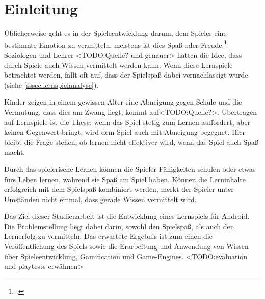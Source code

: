 \section{Einleitung}
	Üblicherweise geht es in der Spieleentwicklung darum, dem Spieler eine bestimmte Emotion zu vermitteln, meistens ist dies Spaß oder Freude.\footcite[Abstract]{persona} Soziologen und Lehrer <TODO:Quelle? und genauer> hatten die Idee, dass durch Spiele auch Wissen vermittelt werden kann. Wenn diese Lernspiele betrachtet werden, fällt oft auf, dass der Spielspaß dabei vernachlässigt wurde (siehe \ref{sssec:lernspielanalyse}).

	Kinder zeigen in einem gewissen Alter eine Abneigung gegen Schule und die Vermutung, dass dies am Zwang liegt, kommt auf<TODO:Quelle?>. Übertragen auf Lernspiele ist die These: wenn das Spiel stetig zum Lernen auffordert, aber keinen Gegenwert bringt, wird dem Spiel auch mit Abneigung begegnet.
	Hier bleibt die Frage stehen, ob lernen nicht effektiver wird, wenn das Spiel auch Spaß macht.

	Durch das spielerische Lernen können die Spieler Fähigkeiten schulen oder etwas fürs Leben lernen, während sie Spaß am Spiel haben. Können die Lerninhalte erfolgreich mit dem Spielspaß kombiniert werden, merkt der Spieler unter Umständen nicht einmal, dass gerade Wissen vermittelt wird.

	Das Ziel dieser Studienarbeit ist die Entwicklung eines Lernspiels für Android. Die Problemstellung liegt dabei darin, sowohl den Spielspaß, als auch den Lernerfolg zu vermitteln. Das erwartete Ergebnis ist zum einen die Veröffentlichung des Spiels sowie die Erarbeitung und Anwendung von Wissen über Spieleentwicklung, Gamification und Game-Engines. <TODO:evaluation und playtests erwähnen>

